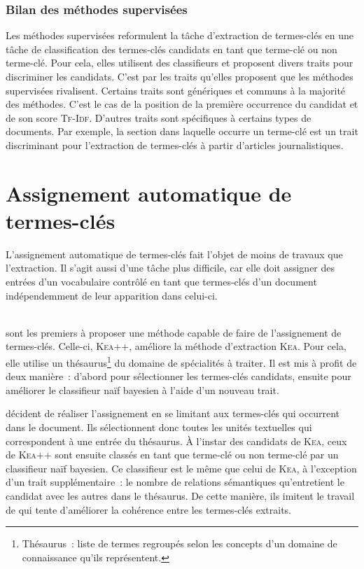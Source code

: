       \subsubsection{Bilan des méthodes supervisées}
      \label{subsubsec:main-state_of_the_art-automatic_keyphrase_extraction-supervised_keyphrase_extraction-conclusion}
        Les méthodes supervisées reformulent la tâche d'extraction de
        termes-clés en une tâche de classification des termes-clés candidats en
        tant que \og{}terme-clé\fg{} ou \og{}non terme-clé\fg{}. Pour cela,
        elles utilisent des classifieurs et proposent divers traits pour
        discriminer les candidats. C'est par les traits qu'elles proposent que
        les méthodes supervisées rivalisent. Certains traits sont génériques et
        communs à la majorité des méthodes. C'est le cas de la position de la
        première occurrence du candidat et de son score \textsc{Tf-Idf}.
        D'autres traits sont spécifiques à certains types de documents. Par
        exemple, la section dans laquelle occurre un terme-clé est un trait
        discriminant pour l'extraction de termes-clés à partir d'articles
        journalistiques.

  \section{Assignement automatique de termes-clés}
  \label{sec:main-state_of_the_art-automatic_keyphrase_assignment}
    L'assignement automatique de termes-clés fait l'objet de moins de travaux
    que l'extraction. Il s'agit aussi d'une tâche plus difficile, car elle doit
    assigner des entrées d'un vocabulaire contrôlé en tant que termes-clés d'un
    document indépendemment de leur apparition dans celui-ci.

    ~\\ sont les premiers à proposer une
    méthode capable de faire de l'assignement de termes-clés. Celle-ci,
    \textsc{Kea}++, améliore la méthode d'extraction \textsc{Kea}. Pour cela,
    elle utilise un thésaurus\footnote{Thésaurus~: liste de termes regroupés
    selon les concepts d'un domaine de connaissance qu'ils représentent.} du
    domaine de spécialités à traiter. Il est mis à profit de deux manière~:
    d'abord pour sélectionner les termes-clés candidats, ensuite pour améliorer
    le classifieur naïf bayesien à l'aide d'un nouveau trait.

     décident de réaliser l'assignement en se
    limitant aux termes-clés qui occurrent dans le document. Ils sélectionnent
    donc toutes les unités textuelles qui correspondent à une entrée du
    thésaurus. À l'instar des candidats de \textsc{Kea}, ceux de \textsc{Kea++}
    sont ensuite classés en tant que \og{}terme-clé\fg{} ou \og{}non
    terme-clé\fg{} par un classifieur naïf bayesien. Ce classifieur est le même
    que celui de \textsc{Kea}, à l'exception d'un trait supplémentaire~: le
    nombre de relations sémantiques qu'entretient le candidat avec les autres
    dans le thésaurus. De cette manière, ils imitent le travail de
     qui tente d'améliorer la cohérence entre
    les termes-clés extraits.

